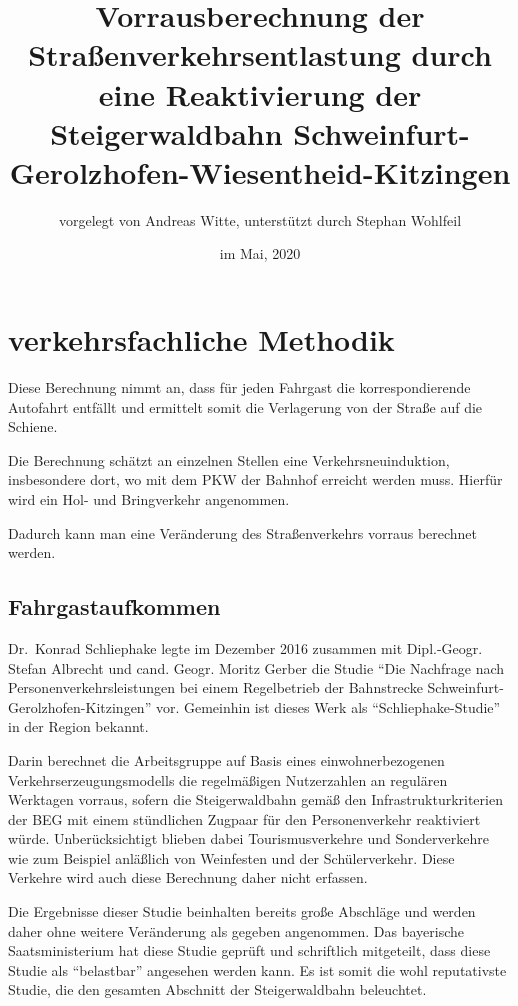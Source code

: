 \documentclass[fontsize=12pt,a4paper]{scrreprt}
\begin{document}
    \title{Vorrausberechnung der Straßenverkehrsentlastung
    durch eine Reaktivierung der Steigerwaldbahn
    Schweinfurt-Gerolzhofen-Wiesentheid-Kitzingen}
    \date{im Mai, 2020}
    \author{vorgelegt von Andreas Witte, unterstützt durch Stephan Wohlfeil}
    \maketitle

    \renewcommand{\contentsname}{Inhaltsverzeichnis}
    \tableofcontents

    \chapter{verkehrsfachliche Methodik}

Diese Berechnung nimmt an, dass für jeden Fahrgast die korrespondierende Autofahrt entfällt und ermittelt somit die Verlagerung von der Straße auf die Schiene.

Die Berechnung schätzt an einzelnen Stellen eine Verkehrsneuinduktion, insbesondere dort, wo mit dem PKW der Bahnhof erreicht werden muss. Hierfür wird ein Hol- und Bringverkehr angenommen.

Dadurch kann man eine Veränderung des Straßenverkehrs vorraus berechnet werden.

        \section{Fahrgastaufkommen}
Dr.\ Konrad Schliephake legte im Dezember 2016 zusammen mit Dipl.-Geogr. Stefan Albrecht und cand. Geogr. Moritz Gerber die Studie \enquote{Die Nachfrage nach Personenverkehrsleistungen bei einem Regelbetrieb der Bahnstrecke Schweinfurt-Gerolzhofen-Kitzingen} vor. Gemeinhin ist dieses Werk als \enquote{Schliephake-Studie} in der Region bekannt.

Darin berechnet die Arbeitsgruppe auf Basis eines einwohnerbezogenen Verkehrserzeugungsmodells die regelmäßigen Nutzerzahlen an regulären Werktagen vorraus, sofern die Steigerwaldbahn gemäß den Infrastrukturkriterien der BEG mit einem stündlichen Zugpaar für den Personenverkehr reaktiviert würde. Unberücksichtigt blieben dabei Tourismusverkehre und Sonderverkehre wie zum Beispiel anläßlich von Weinfesten und der Schülerverkehr. Diese Verkehre wird auch diese Berechnung daher nicht erfassen.

Die Ergebnisse dieser Studie beinhalten bereits große Abschläge und werden daher ohne weitere Veränderung als gegeben angenommen. Das bayerische Saatsministerium hat diese Studie geprüft und schriftlich mitgeteilt, dass diese Studie als \enquote{belastbar} angesehen werden kann. Es ist somit die wohl reputativste Studie, die den gesamten Abschnitt der Steigerwaldbahn beleuchtet.
\end{document}
